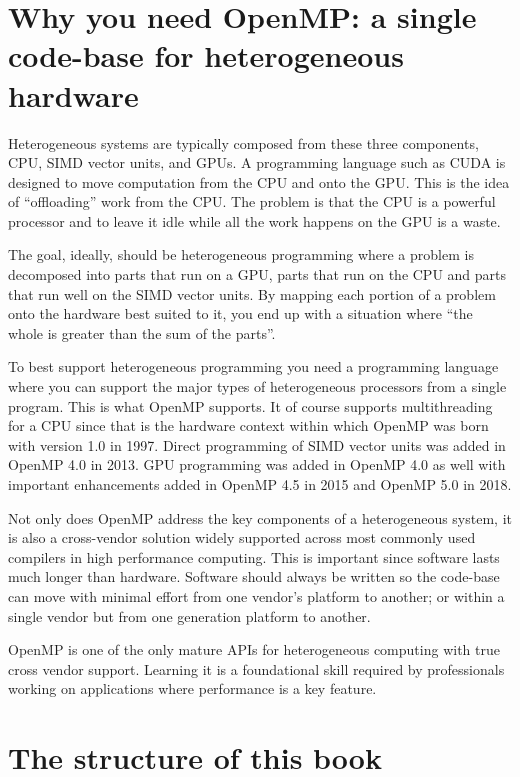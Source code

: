 \section{Why you need OpenMP: a single code-base for heterogeneous hardware}

Heterogeneous systems are typically composed from these three components, CPU, SIMD vector
units, and GPUs.  A programming language such as CUDA is designed to move computation from 
the CPU and onto the GPU.   This is the idea of ``offloading'' work from the CPU.  The problem
is that the CPU is a powerful processor and to leave it idle while all the work happens on the 
GPU is a waste.

The goal, ideally, should be heterogeneous programming where a problem is decomposed
into parts that run on a GPU, parts that  run on the CPU and parts that run well 
on the SIMD vector units.  By mapping each portion of a problem onto the hardware
best suited to it, you end up with a situation where ``the whole is greater than the sum of the parts''.

To best support heterogeneous programming you need a programming language where
you can support the major types of heterogeneous processors from a single program.
This is what OpenMP supports.  It of course supports multithreading for a CPU since that 
is the hardware context within which OpenMP was born with version 1.0 in 1997.  Direct 
programming of SIMD vector units was added in OpenMP 4.0 in 2013.   GPU programming 
was added in OpenMP 4.0 as well with important enhancements added in OpenMP 4.5 in 
2015 and OpenMP 5.0 in 2018.

Not only does OpenMP address the key components of a heterogeneous system, it is also
a cross-vendor solution widely supported across most commonly used compilers
in high performance computing.  This is important since software lasts much longer
than hardware.  Software should always be written so the code-base can move 
with minimal effort from one vendor's platform to another; or within a single vendor
but from one generation platform to another.   

OpenMP is one of the only mature APIs for heterogeneous computing with true cross vendor support.
Learning it is a foundational skill required by professionals working on applications where performance
is a key feature.  



\section{The structure of this book}

